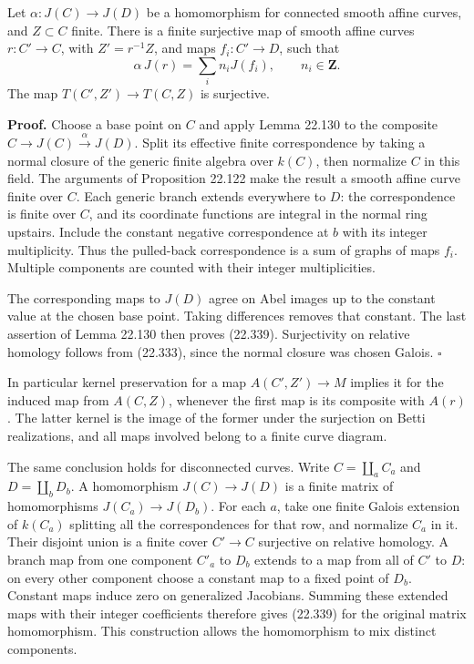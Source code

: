 \documentclass[
  11pt,
  a4paper,
]{article}
\begin{document}
Let \(\alpha:J(C)\to J(D)\) be a homomorphism for connected smooth
affine curves, and \(Z\subset C\) finite. There is a finite surjective
map of smooth affine curves \(r:C'\to C\), with \(Z'=r^{-1}Z\), and maps
\(f_i:C'\to D\), such that \[
 \alpha\,J(r)=\sum_i n_iJ(f_i),\qquad n_i\in\mathbf Z.
 \tag{22.339}
\] The map \(T(C',Z')\to T(C,Z)\) is surjective.

\textbf{Proof.} Choose a base point on \(C\) and apply Lemma 22.130 to
the composite \(C\to J(C)\xrightarrow{\alpha}J(D)\). Split its effective
finite correspondence by taking a normal closure of the generic finite
algebra over \(k(C)\), then normalize \(C\) in this field. The arguments
of Proposition 22.122 make the result a smooth affine curve finite over
\(C\). Each generic branch extends everywhere to \(D\): the
correspondence is finite over \(C\), and its coordinate functions are
integral in the normal ring upstairs. Include the constant negative
correspondence at \(b\) with its integer multiplicity. Thus the
pulled-back correspondence is a sum of graphs of maps \(f_i\). Multiple
components are counted with their integer multiplicities.

The corresponding maps to \(J(D)\) agree on Abel images up to the
constant value at the chosen base point. Taking differences removes that
constant. The last assertion of Lemma 22.130 then proves (22.339).
Surjectivity on relative homology follows from (22.333), since the
normal closure was chosen Galois. \(\square\)

In particular kernel preservation for a map \(A(C',Z')\to M\) implies it
for the induced map from \(A(C,Z)\), whenever the first map is its
composite with \(A(r)\). The latter kernel is the image of the former
under the surjection on Betti realizations, and all maps involved belong
to a finite curve diagram.

The same conclusion holds for disconnected curves. Write
\(C=\coprod_a C_a\) and \(D=\coprod_b D_b\). A homomorphism
\(J(C)\to J(D)\) is a finite matrix of homomorphisms
\(J(C_a)\to J(D_b)\). For each \(a\), take one finite Galois extension
of \(k(C_a)\) splitting all the correspondences for that row, and
normalize \(C_a\) in it. Their disjoint union is a finite cover
\(C'\to C\) surjective on relative homology. A branch map from one
component \(C'_a\) to \(D_b\) extends to a map from all of \(C'\) to
\(D\): on every other component choose a constant map to a fixed point
of \(D_b\). Constant maps induce zero on generalized Jacobians. Summing
these extended maps with their integer coefficients therefore gives
(22.339) for the original matrix homomorphism. This construction allows
the homomorphism to mix distinct components.
\end{document}
